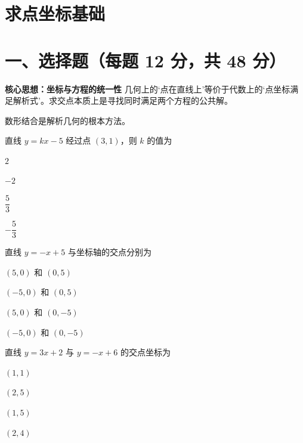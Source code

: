 \documentclass{exam-zh}
\begin{document}
\section*{求点坐标基础}

\section*{一、选择题（每题 12 分，共 48 分）}



\begin{keyideabox}
  \textbf{核心思想：坐标与方程的统一性}
  几何上的‘点在直线上’等价于代数上的‘点坐标满足解析式’。求交点本质上是寻找同时满足两个方程的公共解。
\par\small 数形结合是解析几何的根本方法。\end{keyideabox}



\begin{question}[points=12]
  直线 $y = kx - 5$ 经过点 $(3, 1)$，则 $k$ 的值为
  \begin{choices}
    \item $2$
    \item $-2$
    \item $\dfrac{5}{3}$
    \item $-\dfrac{5}{3}$
  \end{choices}
\end{question}



\begin{question}[points=12]
  直线 $y = -x + 5$ 与坐标轴的交点分别为
  \begin{choices}
    \item $(5, 0)$ 和 $(0, 5)$
    \item $(-5, 0)$ 和 $(0, 5)$
    \item $(5, 0)$ 和 $(0, -5)$
    \item $(-5, 0)$ 和 $(0, -5)$
  \end{choices}
\end{question}



\begin{question}[points=12]
  直线 $y = 3x + 2$ 与 $y = -x + 6$ 的交点坐标为
  \begin{choices}
    \item $(1, 1)$
    \item $(2, 5)$
    \item $(1, 5)$
    \item $(2, 4)$
  \end{choices}
\end{question}
\end{document}
